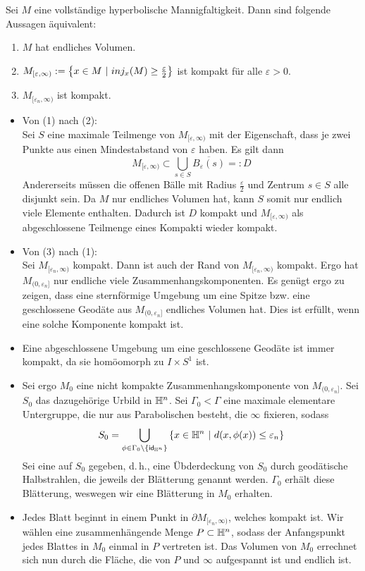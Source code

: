 \documentclass{book}
\renewcommand{\epsilon}{\varepsilon}
\newcommand{\thick}{M_{[\epsilon_n, \infty)}}
\newcommand{\thin}{M_{(0,\epsilon_n]}}
\begin{document}
\Prop{}
Sei $M$ eine vollständige hyperbolische Mannigfaltigkeit. Dann sind folgende Aussagen äquivalent:
\begin{enumerate}[(1)]
	\item $M$ hat endliches Volumen.
	\item $M_{[\epsilon, \infty)}:= \set{x\in M}{ inj_x(M) \geq \frac{\epsilon}{2} }$ ist kompakt für alle $\epsilon > 0$.
	\item $\thick$ ist kompakt.
\end{enumerate}
\begin{Beweis}{}
	\begin{itemize}
		\item Von (1) nach (2):\\
		Sei $S$ eine maximale Teilmenge von $M_{[\epsilon,\infty)}$ mit der Eigenschaft, dass je zwei Punkte aus einen Mindestabstand von ${\epsilon}$ haben. Es gilt dann
		\[ M_{[\epsilon, \infty)} \subset \bigcup_{s \in S} \overline{B_{\epsilon}(s)} =: D \]
		Andererseits müssen die offenen Bälle mit Radius $\frac{\epsilon}{2}$ und Zentrum $s \in S$ alle disjunkt sein. Da $M$ nur endliches Volumen hat, kann $S$ somit nur endlich viele Elemente enthalten. Dadurch ist $D$ kompakt und $ M_{[\epsilon, \infty)}$ als abgeschlossene Teilmenge eines Kompakti wieder kompakt.
		\item Von (3) nach (1):\\
		Sei $\thick$ kompakt. Dann ist auch der Rand von $\thick$ kompakt. Ergo hat $\thin$ nur endliche viele Zusammenhangskomponenten. Es genügt ergo zu zeigen, dass eine sternförmige Umgebung um eine Spitze bzw. eine geschlossene Geodäte aus $\thin$ endliches Volumen hat. Dies ist erfüllt, wenn eine solche Komponente kompakt ist.
		\item Eine abgeschlossene Umgebung um eine geschlossene Geodäte ist immer kompakt, da sie homöomorph zu $I \times S^1$ ist.
		\item Sei ergo $M_0$ eine nicht kompakte Zusammenhangskomponente von $\thin$. Sei $S_0$ das dazugehörige Urbild in $\mathbb{H}^n$. Sei $\Gamma_0 < \Gamma$ eine maximale elementare Untergruppe, die nur aus Parabolischen besteht, die $\infty$ fixieren, sodass
		\[ S_0 = \bigcup_{\phi \in \Gamma_0 \setminus \{ \id{\H^n} \}}\set{ x\in \H^n }{ d(x,\phi(x) ) \leq \epsilon_n } \]
		Sei eine  auf $S_0$ gegeben, d.\,h., 
		eine Übderdeckung von $S_0$ durch geodätische Halbstrahlen, die jeweils  der Blätterung genannt werden. $\Gamma_0$ erhält diese Blätterung, weswegen wir eine Blätterung in $M_0$ erhalten.
		\item Jedes Blatt beginnt in einem Punkt in $\partial \thick$, welches kompakt ist. Wir wählen eine zusammenhängende Menge $P \subset \mathbb{H}^n$, sodass der Anfangspunkt jedes Blattes in $M_0$ einmal in $P$ vertreten ist. Das Volumen von $M_0$ errechnet sich nun durch die Fläche, die von $P$ und $\infty$ aufgespannt ist und endlich ist.
	\end{itemize}
\end{Beweis}
\end{document}
